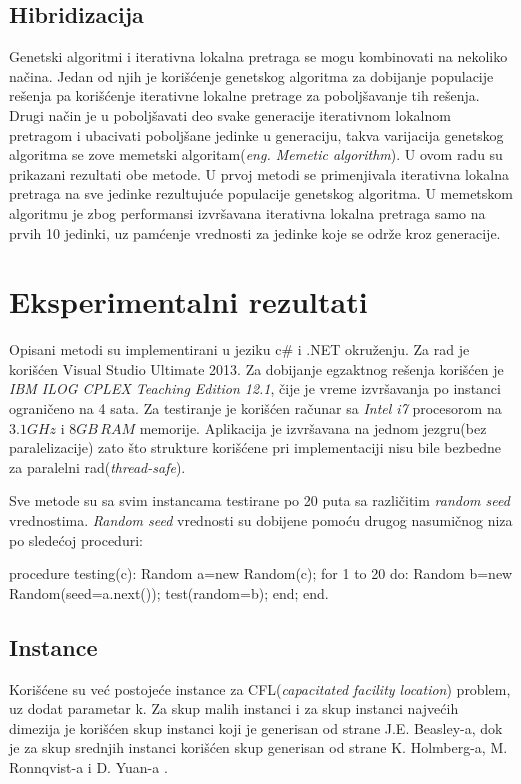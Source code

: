\documentclass[a4paper]{article}
\begin{document}
\subsection{Hibridizacija}

Genetski algoritmi i iterativna lokalna pretraga se mogu kombinovati na nekoliko načina. Jedan od njih je korišćenje genetskog algoritma za dobijanje populacije rešenja pa korišćenje iterativne lokalne pretrage za poboljšavanje tih rešenja. Drugi način je u poboljšavati deo svake generacije iterativnom lokalnom pretragom i ubacivati poboljšane jedinke u generaciju, takva varijacija genetskog algoritma se zove memetski algoritam(\emph{eng. Memetic algorithm})\cite{memetic}. U ovom radu su prikazani rezultati obe metode. U prvoj metodi se primenjivala iterativna lokalna pretraga na sve jedinke rezultujuće populacije genetskog algoritma. U memetskom algoritmu je zbog performansi izvršavana iterativna lokalna pretraga samo na prvih 10 jedinki, uz pamćenje vrednosti za jedinke koje se održe kroz generacije.
\section{Eksperimentalni rezultati}

Opisani metodi su implementirani u jeziku c\# i .NET okruženju. Za rad je korišćen Visual Studio Ultimate 2013. Za dobijanje egzaktnog rešenja korišćen je \emph{IBM ILOG CPLEX Teaching Edition 12.1}, čije je vreme izvršavanja po instanci ograničeno na 4 sata. Za testiranje je korišćen računar sa \emph{Intel i7} procesorom na $3.1GHz$ i $8GB \, RAM$ memorije. Aplikacija je izvršavana na jednom jezgru(bez paralelizacije) zato što strukture korišćene pri implementaciji nisu bile bezbedne za paralelni rad(\emph{thread-safe}).

Sve metode su sa svim instancama testirane po 20 puta sa različitim \emph{random seed} vrednostima. \emph{Random seed} vrednosti su dobijene pomoću drugog nasumičnog niza po sledećoj proceduri:

\begin{algorithm}
procedure testing(c):
	Random a=new Random(c);
	for 1 to 20 do:
		Random b=new Random(seed=a.next());
		test(random=b);
	end;
end.
\end{algorithm}

\subsection{Instance}
Korišćene su već postojeće instance za CFL(\emph{capacitated facility location}) problem, uz dodat parametar k. Za skup malih instanci i za skup instanci najvećih dimezija je korišćen skup instanci koji je generisan od strane J.E. Beasley-a\cite{beasley}, dok je za skup srednjih instanci korišćen skup generisan od strane K. Holmberg-a, M. Ronnqvist-a i D. Yuan-a \cite{holmberg}.
\end{document}
